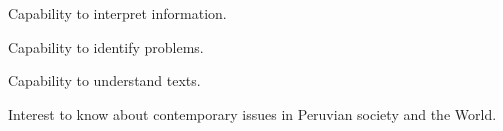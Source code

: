 \begin{syllabus}


\begin{justification}

\end{justification}

\begin{goals}
\item Capability to interpret information.
\item Capability to identify problems.
\item Capability to understand texts.
\item Interest to know about contemporary issues in Peruvian society and the World.
\end{goals}


\begin{outcomes}
    \item {} %
    \item {} %
    \item {} %
    \item {} %
    \item {} %
\end{outcomes}

\begin{competences}
    \item {}
    \item {}
    \item {}
    \item {}
\end{competences}


\end{syllabus}
